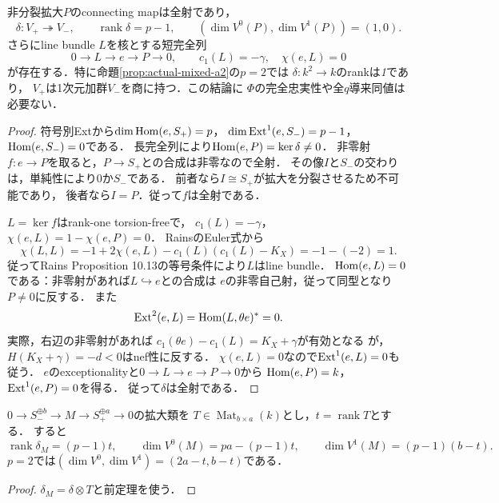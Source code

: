 \begin{theorem}
\label{thm:a2-delta-rank}
非分裂拡大$P$のconnecting mapは全射であり，
\[
\delta:V_+\twoheadrightarrow V_-,\qquad
\operatorname{rank}\delta=p-1,\qquad
(\dim V^0(P),\dim V^1(P))=(1,0).
\]
さらにline bundle $L$を核とする短完全列
\[
0\longrightarrow L\longrightarrow e\longrightarrow P\longrightarrow0,
\qquad c_1(L)=-\gamma,\quad \chi(e,L)=0
\]
が存在する．特に命題\ref{prop:actual-mixed-a2}の$p=2$では
$\delta:k^2\to k$のrankは\emph{1}であり，
$V_+$は1次元加群$V_-$を商に持つ．この結論に
$\Phi$の完全忠実性や全$q$導来同値は必要ない．
\end{theorem}
\begin{proof}
符号別Extから$\dim\operatorname{Hom}(e,S_+)=p$，
$\dim\operatorname{Ext}^1(e,S_-)=p-1$，$\operatorname{Hom}(e,S_-)=0$である．
長完全列により$\operatorname{Hom}(e,P)=\ker\delta\ne0$．
非零射$f:e\to P$を取ると，$P\to S_+$との合成は非零なので全射．
その像$I$と$S_-$の交わりは，単純性により$0$か$S_-$である．
前者なら$I\cong S_+$が拡大を分裂させるため不可能であり，
後者なら$I=P$．従って$f$は全射である．

$L=\ker f$はrank-one torsion-freeで，
$c_1(L)=-\gamma$，$\chi(e,L)=1-\chi(e,P)=0$．
RainsのEuler式から
\[
\chi(L,L)=-1+2\chi(e,L)-c_1(L)(c_1(L)-K_X)
=-1-(-2)=1.
\]
従ってRains Proposition 10.13の等号条件により$L$はline bundle．
$\operatorname{Hom}(e,L)=0$である：非零射があれば$L\hookrightarrow e$との合成は
$e$の非零自己射，従って同型となり$P\ne0$に反する．
また
\[
\operatorname{Ext}^2(e,L)=\operatorname{Hom}(L,\theta e)^*=0.
\]
実際，右辺の非零射があれば
$c_1(\theta e)-c_1(L)=K_X+\gamma$が有効となる
\cite[Corollary 10.12]{RainsBirational}が，
$H(K_X+\gamma)=-d<0$はnef性に反する．
$\chi(e,L)=0$なので$\operatorname{Ext}^1(e,L)=0$も従う．
$e$のexceptionalityと$0\to L\to e\to P\to0$から
$\operatorname{Hom}(e,P)=k$，$\operatorname{Ext}^1(e,P)=0$を得る．
従って$\delta$は全射である．
\end{proof}

\begin{corollary}[直和を用いた二段拡大の正確な公式]
\label{cor:a2-rank-matrix-exact}
$0\to S_-^{\oplus b}\to M\to S_+^{\oplus a}\to0$の拡大類を
$T\in\operatorname{Mat}_{b\times a}(k)$とし，$t=\operatorname{rank}T$とする．
すると
\[
\operatorname{rank}\delta_M=(p-1)t,\qquad
\dim V^0(M)=pa-(p-1)t,\qquad
\dim V^1(M)=(p-1)(b-t).
\]
$p=2$では$(\dim V^0,\dim V^1)=(2a-t,b-t)$である．
\end{corollary}
\begin{proof}
$\delta_M=\delta\otimes T$と前定理を使う．
\end{proof}

